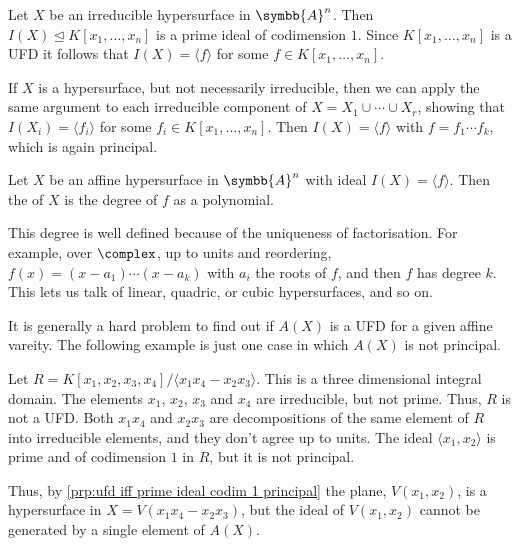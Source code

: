 \documentclass[fleqn]{NotesClass}
\newcommand{\subideal}{\trianglelefteq}
\newcommand{\affine}{\symbb{A}}
\begin{document}
    Let \(X\) be an irreducible hypersurface in \(\affine^n\).
    Then \(I(X) \subideal K[x_1, \dotsc, x_n]\) is a prime ideal of codimension \(1\).
    Since \(K[x_1, \dotsc, x_n]\) is a UFD it follows that \(I(X) = \langle f \rangle\) for some \(f \in K[x_1, \dotsc, x_n]\).
    
    If \(X\) is a hypersurface, but not necessarily irreducible, then we can apply the same argument to each irreducible component of \(X = X_1 \cup \dotsb \cup X_r\), showing that \(I(X_i) = \langle f_i \rangle\) for some \(f_i \in K[x_1, \dotsc, x_n]\).
    Then \(I(X) = \langle f \rangle\) with \(f = f_1 \dotsm f_k\), which is again principal.
    
    \begin{dfn}{}{}
        Let \(X\) be an affine hypersurface in \(\affine^n\) with ideal \(I(X) = \langle f \rangle\).
        Then the  of \(X\) is the degree of \(f\) as a polynomial.
    \end{dfn}
    
    This degree is well defined because of the uniqueness of factorisation.
    For example, over \(\complex\), up to units and reordering, \(f(x) = (x - a_1) \dotsm (x - a_k)\) with \(a_i\) the roots of \(f\), and then \(f\) has degree \(k\).
    This lets us talk of linear, quadric, or cubic hypersurfaces, and so on.
    
    It is generally a hard problem to find out if \(A(X)\) is a UFD for a given affine vareity.
    The following example is just one case in which \(A(X)\) is not principal.
    
    \begin{exm}{}{}
        Let \(R = K[x_1, x_2, x_3, x_4] / \langle x_1x_4 - x_2x_3 \rangle\).
        This is a three dimensional integral domain.
        The elements \(x_1\), \(x_2\), \(x_3\) and \(x_4\) are irreducible, but not prime.
        Thus, \(R\) is not a UFD.
        Both \(x_1x_4\) and \(x_2x_3\) are decompositions of the same element of \(R\) into irreducible elements, and they don't agree up to units.
        The ideal \(\langle x_1, x_2\rangle\) is prime and of codimension \(1\) in \(R\), but it is not principal.
        
        Thus, by \cref{prp:ufd iff prime ideal codim 1 principal} the plane, \(V(x_1, x_2)\), is a hypersurface in \(X = V(x_1x_4 - x_2x_3)\), but the ideal of \(V(x_1, x_2)\) cannot be generated by a single element of \(A(X)\).
    \end{exm}
    
    \appendixpage
    \begin{appendices}
        
        
    \end{appendices}
    \printbibliography
    \backmatter
    \renewcommand{\glossaryname}{Acronyms}
    \printglossary[acronym]
    \printindex
\end{document}
